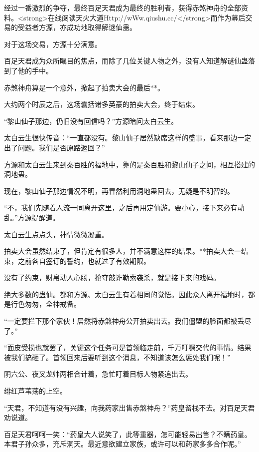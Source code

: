 
\begin{this_body}

经过一番激烈的争夺，最终百足天君成为最终的胜利者，获得赤煞神舟的全部资料。<strong>在线阅读天火大道Http://wWw.qiushu.cc/</strong>而作为幕后交易的受益者方源，亦成功地取得解谜仙蛊。

对于这场交易，方源十分满意。

百足天君成为众所瞩目的焦点，而除了几位关键人物之外，没有人知道解谜仙蛊落到了他的手中。

赤煞神舟算是一个意外，掀起了拍卖大会的最后**。

大约两个时辰之后，这场囊括诸多英豪的拍卖大会，终于结束。

“黎山仙子那边，仍旧没有回信吗？”方源暗问太白云生。

太白云生很快传音：“一直都没有。黎山仙子居然缺席这样的盛事，看来那边一定出了问题。我们是否原路返回？”

方源和太白云生来到秦百胜的福地中，靠的是秦百胜和黎山仙子之间，相互搭建的洞地蛊。

现在，黎山仙子那边情况不明，再冒然利用洞地蛊回去，无疑是不明智的。

“不，我们先随着人流一同离开这里，之后再用定仙游。要小心，接下来必有动乱。”方源提醒道。

太白云生点点头，神情微微凝重。

拍卖大会虽然结束了，但肯定有很多人，并不满意这样的结果。**拍卖大会一结束，之前各自签订的誓约，也就过了有效期限。

没有了约束，财帛动人心肠，抢夺敲诈勒索袭杀，就是接下来的戏码。

绝大多数的蛊仙。都和方源、太白云生有着相同的觉悟。因此众人离开福地时，都是行色匆匆，全神戒备。

“一定要拦下那个家伙！居然将赤煞神舟公开拍卖出去。我们僵盟的脸面都被丢尽了。”

“面皮受损也就罢了，关键这个任务可是首领临走前，千万叮嘱交代的事情。结果被我们搞砸了。首领回来后要听到这个消息，不知道该怎么惩处我们呢！”

阴六公、夜叉龙帅两相合计着，急忙盯着目标人物紧追出去。

绯红芦苇荡的上空。

“天君，不知道有没有兴趣，向我药家出售赤煞神舟？”药皇留栈不去。对百足天君劝说道。

百足天君呵呵一笑：“药皇大人说笑了，此等重器，怎可能轻易出售？不瞒药皇。本君子孙众多，充斥洞天。最近意欲建立家族，或许可以和药家多多合作呢。”


\end{this_body}
